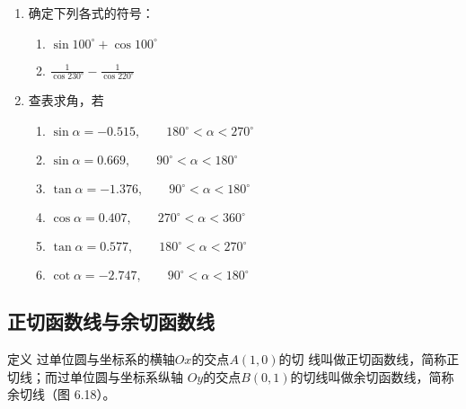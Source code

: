 \begin{enumerate}
\item 确定下列各式的符号：
\begin{multicols}{2}
\begin{enumerate}
    \item $\sin 100^{\circ}+\cos100^{\circ}$
    \item $\frac{1}{\cos230^{\circ}}-\frac{1}{\cos220^{\circ}}$
\end{enumerate}
\end{multicols}

\item 查表求角，若
\begin{enumerate}
    \item $\sin\alpha=-0.515,\qquad 180^{\circ}<\alpha<270^{\circ}$
    \item $\sin\alpha=0.669,\qquad 90^{\circ}<\alpha<180^{\circ}$
    \item  $\tan\alpha=-1.376,\qquad 90^{\circ}<\alpha<180^{\circ}$
    \item $\cos\alpha=0.407,\qquad 270^{\circ}<\alpha<360^{\circ}$
    \item $\tan\alpha=0.577,\qquad 180^{\circ}<\alpha<270^{\circ}$
    \item $\cot\alpha=-2.747,\qquad 90^{\circ}<\alpha<180^{\circ}$
\end{enumerate}
\end{enumerate}

\subsection{正切函数线与余切函数线}
\begin{blk}{定义}
    过单位圆与坐标系的横轴$Ox$的交点$A(1,0)$的切
线叫做正切函数线，简称正切线；而过单位圆与坐标系纵轴
$Oy$的交点$B(0,1)$的切线叫做余切函数线，简称余切线（图
6.18）。
\end{blk}

\begin{figure}[htp]
    \centering
{}
    \caption{}
\end{figure}



